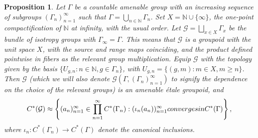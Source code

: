 \documentclass[11 pt, leqno, hidelinks]{amsart}%
\theoremstyle{plain}
\newtheorem{proposition}[theorem]{Proposition}
\numberwithin{equation}{section}
\newcommand{\G}{\mathcal{G}}
\newcommand{\N}{\mathbb{N}}
\newcommand{\GG}{\mathcal{G}}
\begin{document}
\begin{proposition} \label{prop:indgrp}
Let $\Gamma$ be a countable amenable group with an increasing sequence of subgroups $(\Gamma_n)_{n=1}^\infty$ such that $\Gamma=\bigcup_{n\in \N} \Gamma_n$. Set $X =\N \cup \{\infty\}$, the one-point compactification of $\N$ at infinity, with the usual order. Let $\GG= \bigsqcup_{x \in X} \Gamma_x$ be the bundle of isotropy groups with $\Gamma_\infty=\Gamma$. This means that $\GG$ is a groupoid with the unit space $X$, with the source and range maps coinciding, and the product defined pointwise in fibers as the relevant group multiplication.
Equip $\GG$ with the topology given by the basis $\{U_{g,n}: n \in \N, g \in \Gamma_n\}$,
 with $U_{g,n}=\{(g,m): m \in X, m \geq n\}$.
 Then $\GG$ (which we will also denote $\GG(\Gamma, (\Gamma_n)_{n=1}^\infty)$ to signify the dependence on the choice of the relevant groups) is an amenable \'etale groupoid, and
 \[C^*(\G) \approx \left\{(a_n)_{n=1}^\infty \in \prod_{n=1}^\infty C^*(\Gamma_n): (\iota_n(a_n) )_{n=1}^\infty \textup{ converges in }C^*(\Gamma)\right\},\]
where $\iota_n:C^*(\Gamma_n) \to C^*(\Gamma)$ denote the canonical inclusions.
\end{proposition}
\end{document}
